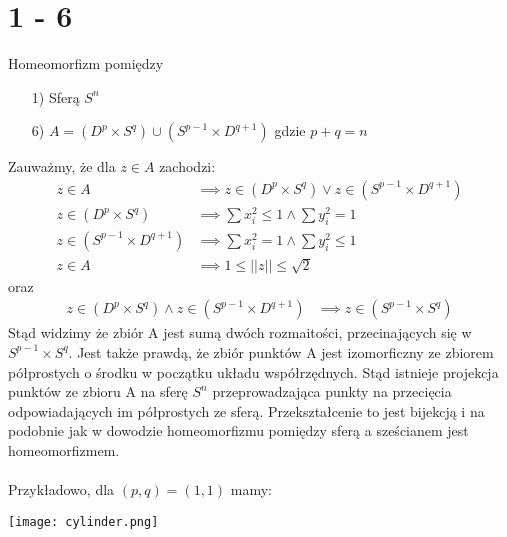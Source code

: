 \newpage
\section*{1 - 6}
Homeomorfizm pomiędzy
\begin{itemize}
  \item[1)] Sferą $S^n$
  \item[6)] $A = (D^p \times S^q) \cup (S^{p-1} \times D^{q+1})$ gdzie $p+q = n$
\end{itemize}
Zauważmy, że dla $z \in A$ zachodzi:
\begin{align*}
  z \in A & \implies z \in (D^p \times S^q) \lor z \in (S^{p-1} \times D^{q+1}) \\
  z \in (D^p \times S^q) & \implies \sum x_i^2 \leq 1 \land \sum y_i^2 = 1 \\
  z \in (S^{p-1} \times D^{q+1}) & \implies \sum x_i^2 = 1 \land \sum y_i^2 \leq 1 \\
  z \in A & \implies 1 \leq ||z|| \leq \sqrt{2}
\end{align*}
oraz
\begin{align*}
  z \in (D^p \times S^q) \land z \in (S^{p-1} \times D^{q+1})  & \implies z \in (S^{p-1} \times S^q)
\end{align*}
Stąd widzimy że zbiór A jest sumą dwóch rozmaitości, przecinających się w $S^{p-1} \times S^q$. Jest także prawdą, że zbiór punktów A jest izomorficzny ze zbiorem półprostych o środku w początku układu współrzędnych. Stąd istnieje projekcja punktów ze zbioru A na sferę $S^n$ przeprowadzająca punkty na przecięcia odpowiadających im półprostych ze sferą. Przekształcenie to jest bijekcją i na podobnie jak w dowodzie homeomorfizmu pomiędzy sferą a sześcianem \cite{hom-cube-sphere} jest homeomorfizmem. \\
\\
Przykładowo, dla  $(p, q) = (1, 1)$ mamy:

\texttt{[image: cylinder.png]}
